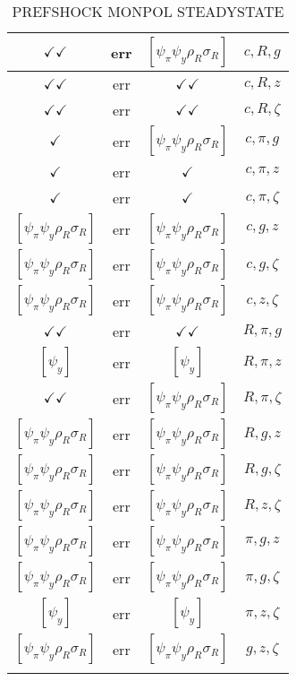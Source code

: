 \documentclass[a4paper,10pt]{article}
\begin{document}
\begin{longtable}{|c|c|c|c|}
\hline
$\checkmark\checkmark$ & err & $[\psi_\pi \psi_y \rho_R \sigma_R ]$ & ${c},{R},{g}$ \\
\hline
$\checkmark\checkmark$ & err & $\checkmark\checkmark$ & ${c},{R},{z}$ \\
\hline
$\checkmark\checkmark$ & err & $\checkmark\checkmark$ & ${c},{R},{\zeta}$ \\
\hline
$\checkmark$ & err & $[\psi_\pi \psi_y \rho_R \sigma_R ]$ & ${c},{\pi},{g}$ \\
\hline
$\checkmark$ & err & $\checkmark$ & ${c},{\pi},{z}$ \\
\hline
$\checkmark$ & err & $\checkmark$ & ${c},{\pi},{\zeta}$ \\
\hline
$[\psi_\pi \psi_y \rho_R \sigma_R ]$ & err & $[\psi_\pi \psi_y \rho_R \sigma_R ]$ & ${c},{g},{z}$ \\
\hline
$[\psi_\pi \psi_y \rho_R \sigma_R ]$ & err & $[\psi_\pi \psi_y \rho_R \sigma_R ]$ & ${c},{g},{\zeta}$ \\
\hline
$[\psi_\pi \psi_y \rho_R \sigma_R ]$ & err & $[\psi_\pi \psi_y \rho_R \sigma_R ]$ & ${c},{z},{\zeta}$ \\
\hline
$\checkmark\checkmark$ & err & $\checkmark\checkmark$ & ${R},{\pi},{g}$ \\
\hline
$[\psi_y ]$ & err & $[\psi_y ]$ & ${R},{\pi},{z}$ \\
\hline
$\checkmark\checkmark$ & err & $[\psi_\pi \psi_y \rho_R \sigma_R ]$ & ${R},{\pi},{\zeta}$ \\
\hline
$[\psi_\pi \psi_y \rho_R \sigma_R ]$ & err & $[\psi_\pi \psi_y \rho_R \sigma_R ]$ & ${R},{g},{z}$ \\
\hline
$[\psi_\pi \psi_y \rho_R \sigma_R ]$ & err & $[\psi_\pi \psi_y \rho_R \sigma_R ]$ & ${R},{g},{\zeta}$ \\
\hline
$[\psi_\pi \psi_y \rho_R \sigma_R ]$ & err & $[\psi_\pi \psi_y \rho_R \sigma_R ]$ & ${R},{z},{\zeta}$ \\
\hline
$[\psi_\pi \psi_y \rho_R \sigma_R ]$ & err & $[\psi_\pi \psi_y \rho_R \sigma_R ]$ & ${\pi},{g},{z}$ \\
\hline
$[\psi_\pi \psi_y \rho_R \sigma_R ]$ & err & $[\psi_\pi \psi_y \rho_R \sigma_R ]$ & ${\pi},{g},{\zeta}$ \\
\hline
$[\psi_y ]$ & err & $[\psi_y ]$ & ${\pi},{z},{\zeta}$ \\
\hline
$[\psi_\pi \psi_y \rho_R \sigma_R ]$ & err & $[\psi_\pi \psi_y \rho_R \sigma_R ]$ & ${g},{z},{\zeta}$ \\
\hline
\caption{PREFSHOCK MONPOL STEADYSTATE}
\label{table:MyTableLabel}
\end{longtable}
\end{document}
